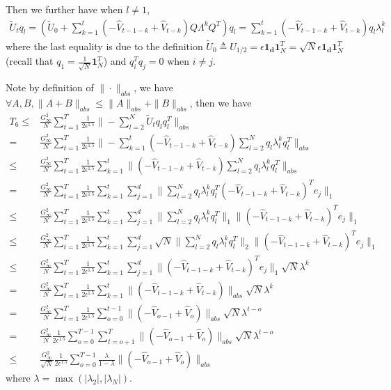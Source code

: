 \documentclass{article} %
\begin{document}
Then we further have when $l \neq 1$,
\begin{align}
\tilde U_t q_l = (\tilde U_0 + \sum_{k=1}^t (- \hat V_{t-1-k} + \hat V_{t-k} ) Q \Lambda^k Q^T) q_l =   \sum_{k=1}^t (- \hat V_{t-1-k} + \hat V_{t-k} ) q_l \lambda_l^k 
\end{align}
where the last equality is due to the definition $\tilde U_0 \triangleq U_{1/2} =  \epsilon \mathbf{1_d} \mathbf 1_N^T = \sqrt{N}  \epsilon \mathbf{1_d} \mathbf 1_N^T$ (recall that $q_1 = \frac{1}{\sqrt{N}}\mathbf 1_N^T$) and $q_i^T q_j = 0$ when $i \neq j$.

Note by definition of $\|\cdot \|_{abs}$, we have $\forall A, B, \|A+B\|_{abs} \leq \|A\|_{abs} + \|B\|_{abs} $, then we have 
\begin{align}\label{eq: T_6_bound}
T_6 \leq & \frac{G_{\infty}^2}{N}\sum_{t=1}^T \frac{1}{2\epsilon^{1.5}}  \| - \sum_{l=2}^N  \tilde U_t q_l q_l^T \|_{abs} \nonumber \\
=  & \frac{G_{\infty}^2}{N}\sum_{t=1}^T \frac{1}{2\epsilon^{1.5}}  \| -   \sum_{k=1}^t (- \hat V_{t-1-k} + \hat V_{t-k} )  \sum_{l=2}^N q_l \lambda_l^k q_l^T \|_{abs} \nonumber \\ 
\leq & \frac{G_{\infty}^2}{N}\sum_{t=1}^T \frac{1}{2\epsilon^{1.5}}  \sum_{k=1}^t \|     (- \hat V_{t-1-k} + \hat V_{t-k} )  \sum_{l=2}^N q_l \lambda_l^k q_l^T \|_{abs} \nonumber \\
= &    \frac{G_{\infty}^2}{N}\sum_{t=1}^T \frac{1}{2\epsilon^{1.5}}  \sum_{k=1}^t \sum_{j=1}^d \| \sum_{l=2}^N q_l \lambda_l^k q_l^T     (- \hat V_{t-1-k} + \hat V_{t-k} )^T e_j  \|_{1} \nonumber \\
\leq &  \frac{G_{\infty}^2}{N}\sum_{t=1}^T \frac{1}{2\epsilon^{1.5}}  \sum_{k=1}^t  \sum_{j=1}^d \| \sum_{l=2}^N q_l \lambda_l^k q_l^T \|_{1}  \|     (- \hat V_{t-1-k} + \hat V_{t-k} )^T e_j \|_1  \nonumber \\
\leq &  \frac{G_{\infty}^2}{N}\sum_{t=1}^T \frac{1}{2\epsilon^{1.5}}  \sum_{k=1}^t  \sum_{j=1}^d  \sqrt{N}\| \sum_{l=2}^N q_l \lambda_l^k q_l^T \|_{2}  \|     (- \hat V_{t-1-k} + \hat V_{t-k} )^T e_j \|_1  \nonumber \\
\leq  & \frac{G_{\infty}^2}{N}\sum_{t=1}^T \frac{1}{2\epsilon^{1.5}}  \sum_{k=1}^t \sum_{j=1}^d \|    (- \hat V_{t-1-k} + \hat V_{t-k} )^T e_j\|_1 \sqrt{N} \lambda^k \nonumber \\
=  & \frac{G_{\infty}^2}{N}\sum_{t=1}^T \frac{1}{2\epsilon^{1.5}}  \sum_{k=1}^t  \|    (- \hat V_{t-1-k} + \hat V_{t-k} ) \|_{abs} \sqrt{N} \lambda^k \nonumber \\
=  & \frac{G_{\infty}^2}{N}\sum_{t=1}^T \frac{1}{2\epsilon^{1.5}}  \sum_{o=0}^{t-1}  \|    (- \hat V_{o-1} + \hat V_{o} ) \|_{abs} \sqrt{N} \lambda^{t-o} \nonumber \\
=  & \frac{G_{\infty}^2}{N}\frac{1}{2\epsilon^{1.5}} \sum_{o=0}^{T-1} \sum_{t=o+1}^T     \|    (- \hat V_{o-1} + \hat V_{o} ) \|_{abs} \sqrt{N} \lambda^{t-o} \nonumber \\ 
\leq & \frac{G_{\infty}^2}{\sqrt{N}}\frac{1}{2\epsilon^{1.5}} \sum_{o=0}^{T-1} \frac{\lambda}{1-\lambda}     \|    (- \hat V_{o-1} + \hat V_{o} ) \|_{abs}  
\end{align}
where $\lambda = \max (|\lambda_2|,|\lambda_N|)$.
\end{document}

